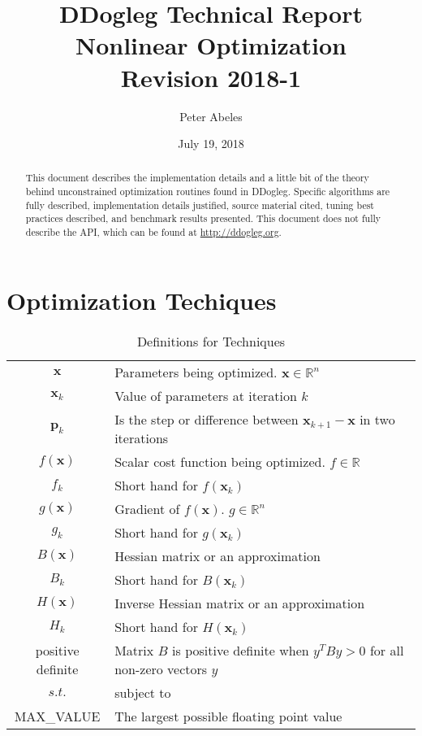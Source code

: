 \documentclass[peerreview,compsoc,onecolumn]{IEEEtran}
\newcommand{\R}{\mathbb{R}}
\begin{document}
\title{DDogleg Technical Report\\ Nonlinear Optimization\\{\Large Revision 2018-1}}


\author{Peter Abeles}
\date{July 19, 2018}

\maketitle
\tableofcontents
\listoffigures
\listoftables

\IEEEpeerreviewmaketitle
\begin{abstract}
This document describes the implementation details and a little bit of the theory behind unconstrained optimization routines found in DDogleg. Specific algorithms are fully described, implementation details justified, source material cited, tuning best practices described, and benchmark results presented. This document does not fully describe the API, which can be found at \url{http://ddogleg.org}.
\end{abstract}


\section{Optimization Techiques}

\begin{table}[h]
\centering
\caption{\label{definitions:Techniques}Definitions for Techniques}
\begin{tabular}{cl}
$\bm{x}$ & Parameters being optimized. $\bm{x} \in \R^n$ \\
$\bm{x}_k$ & Value of parameters at iteration $k$ \\
$\bm{p}_k$ & Is the step or difference between $\bm{x}_{k+1}-\bm{x}$ in two iterations \\
$f(\bm{x})$ & Scalar cost function being optimized. $f \in \R$ \\
$f_k$ & Short hand for $f(\bm{x}_k)$ \\
$g(\bm{x})$ & Gradient of $f(\bm{x})$. $g \in \R^n$ \\
$g_k$ & Short hand for $g(\bm{x}_k)$ \\
$B(\bm{x})$ & Hessian matrix or an approximation \\ 
$B_k$ & Short hand for $B(\bm{x}_k)$ \\
$H(\bm{x})$ & Inverse Hessian matrix or an approximation \\ 
$H_k$ & Short hand for $H(\bm{x}_k)$ \\
positive definite & Matrix $B$ is positive definite when $y^T B y > 0$ for all non-zero vectors $y$  \\
$s.t.$ & subject to  \\
MAX\_VALUE & The largest possible floating point value
\end{tabular}
\end{table}
\end{document}
